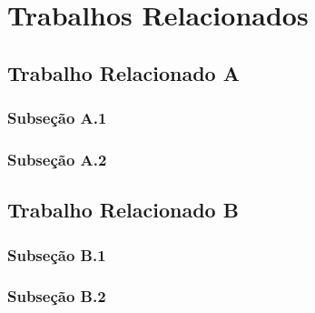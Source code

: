 \chapter{Trabalhos Relacionados}
\label{cap:trabalhos-relacionados}

\section{T\lowercase{rabalho} R\lowercase{elacionado} A}
\label{sec:trabalhos-relacionado-a}

\subsection{Subseção A.1}

\subsection{Subseção A.2}

\section{T\lowercase{rabalho} R\lowercase{elacionado} B}
\label{sec:trabalhos-relacionado-b}

\subsection{Subseção B.1}

\subsection{Subseção B.2}